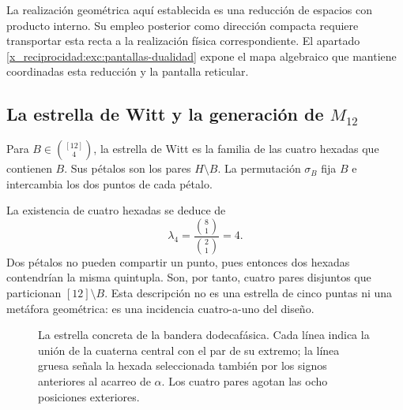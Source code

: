 La realización geométrica aquí establecida es una reducción de espacios
con producto interno. Su empleo posterior como dirección compacta
requiere transportar esta recta a la realización física correspondiente.
El apartado \ref{x_reciprocidad:exc:pantallas-dualidad} expone el mapa algebraico
que mantiene coordinadas esta reducción y la pantalla reticular.



\subsection{La estrella de Witt y la generación de \texorpdfstring{$M_{12}$}{M12}}
\label{x_reciprocidad:exc:estrella}

\begin{definition}
\label{x_reciprocidad:exc:def-estrella}
Para $B\in\binom{[12]}4$, la estrella de Witt es la familia de las
cuatro hexadas que contienen $B$. Sus pétalos son los pares $H\setminus B$.
La permutación $\sigma_B$ fija $B$ e intercambia los dos puntos de cada
pétalo.
\end{definition}

La existencia de cuatro hexadas se deduce de
\[
 \lambda_4=\frac{\binom81}{\binom21}=4.
\]
Dos pétalos no pueden compartir un punto, pues entonces dos hexadas
contendrían la misma quintupla. Son, por tanto, cuatro pares disjuntos
que particionan $[12]\setminus B$. Esta descripción no es una estrella
de cinco puntas ni una metáfora geométrica: es una incidencia
cuatro-a-uno del diseño.

\begin{figure}[htbp]
\centering
{}
\caption{La estrella concreta de la bandera dodecafásica. Cada línea
indica la unión de la cuaterna central con el par de su extremo; la
línea gruesa señala la hexada seleccionada también por los signos
anteriores al acarreo de $\alpha$. Los cuatro pares agotan las ocho
posiciones exteriores.}
\label{x_reciprocidad:exc:fig-estrella}
\end{figure}

